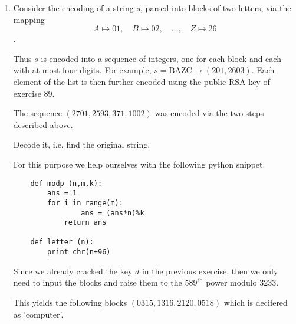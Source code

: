 \documentclass[12pt]{article}
\begin{document}
\begin{enumerate}
\begin{proof}
    Therefore the public key $d = -191 = 589$. A quick sanity check verifies that indeed $589 \cdot 49 \underset{\textrm{mod }780}{\equiv} 1$.
    \end{proof}
    
    \item Consider the encoding of a string $s$, parsed into blocks of two letters, via the mapping 
    $$ A \mapsto 01, \quad B \mapsto 02, \quad \ldots , \quad Z \mapsto 26$$.
    
    Thus $s$ is encoded into a sequence of integers, one for each block and each with at most four digits. For example, $s= \textrm{BAZC} \mapsto (201,2603)$. Each element of the list is then further encoded using the public RSA key of exercise 89.
    
    The sequence $(2701,2593,371,1002)$ was encoded via the two steps described above.
    
    Decode it, i.e. find the original string.
    
    For this purpose we help ourselves with the following python snippet.
    
    \begin{verbatim}
    def modp (n,m,k):
        ans = 1
        for i in range(m):
	            ans = (ans*n)%k
	        return ans

    def letter (n):
        print chr(n+96)
    \end{verbatim}
    
    Since we already cracked the key $d$ in the previous exercise, then we only need to input the blocks and raise them to the $589^{\textrm{th}}$ power modulo $3233$.
    
    This yields the following blocks $(0315,1316,2120,0518)$ which is decifered as 'computer'.
    
    
\end{enumerate}
\end{document}

